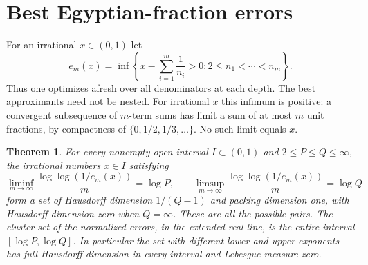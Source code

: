 \documentclass[11pt]{article}
\newtheorem{theorem}{Theorem}[section]
\begin{document}
\section{Best Egyptian-fraction errors}
For an irrational $x\in(0,1)$ let
\[
 e_m(x)=\inf\left\{x-\sum_{i=1}^m\frac1{n_i}>0:
                  2\le n_1<\cdots<n_m\right\}.
\]
Thus one optimizes afresh over all denominators at each depth. The best approximants need not be nested. For irrational $x$ this infimum is positive: a convergent subsequence of $m$-term sums has limit a sum of at most $m$ unit fractions, by compactness of $\{0,1/2,1/3,\ldots\}$. No such limit equals $x$.
\begin{theorem}\label{th:egypt}
For every nonempty open interval $I\subset(0,1)$ and $2\le P\le Q\le\infty$, the irrational numbers $x\in I$ satisfying
\[
 \liminf_{m\to\infty}\frac{\log\log(1/e_m(x))}{m}=\log P,\qquad
 \limsup_{m\to\infty}\frac{\log\log(1/e_m(x))}{m}=\log Q
\]
form a set of Hausdorff dimension $1/(Q-1)$ and packing dimension one, with Hausdorff dimension zero when $Q=\infty$. These are all the possible pairs. The cluster set of the normalized errors, in the extended real line, is the entire interval $[\log P,\log Q]$. In particular the set with different lower and upper exponents has full Hausdorff dimension in every interval and Lebesgue measure zero.
\end{theorem}
\end{document}
